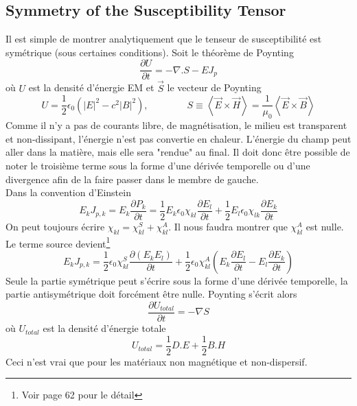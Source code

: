 \subsection{Symmetry of the Susceptibility Tensor}
Il est simple de montrer analytiquement que le tenseur de susceptibilité est symétrique (sous certaines conditions).
Soit le théorème de Poynting
\begin{equation}
\dfrac{\partial U}{\partial t} = -\nabla.S-EJ_p
\end{equation}
où $U$ est la densité d'énergie EM et $\vec{S}$ le vecteur de Poynting
\begin{equation}
U = \frac{1}{2}\epsilon_0\left(|E|^2-c^2|B|^2\right),\qquad\qquad
S \equiv \left\langle \vec{E}\times\vec{H}\right\rangle = \frac{1}{\mu_0}
\left\langle \vec{E}\times\vec{B}\right\rangle
\end{equation}
Comme il  n'y a pas de courants libre, de magnétisation, le milieu est transparent et non-dissipant, l'énergie
n'est pas convertie en chaleur. L'énergie du champ peut aller dans la matière, mais elle sera "rendue" au final.
Il doit donc être possible de noter le troisième terme sous la forme d'une dérivée temporelle ou d'une divergence
afin de la faire passer dans le membre de gauche.\\

Dans la convention d'Einstein
\begin{equation}
E_kJ_{p,k} = E_k\frac{\partial P_k}{\partial t} = \frac{1}{2}E_k\epsilon_0\chi_{kl}\frac{\partial E_l}{\partial t}+
\frac{1}{2}E_l\epsilon_0\chi_{lk}\frac{\partial E_k}{\partial t}
\end{equation}
On peut toujours écrire $\chi_{kl} = \chi_{kl}^S+\chi_{kl}^A$. Il nous faudra montrer que $\chi_{kl}^A$ est
nulle. Le terme source devient\footnote{Voir page 62 pour le détail}
\begin{equation}
E_kJ_{p,k} = \frac{1}{2}\epsilon_0\chi_{kl}^S\frac{\partial (E_kE_l)}{\partial t}+\frac{1}{2}
\epsilon_0\chi_{kl}^A\left(E_k\frac{\partial E_l}{\partial t}-E_l\frac{\partial E_k}{\partial t}\right)
\end{equation}
Seule la partie symétrique peut s'écrire sous la forme d'une dérivée temporelle, la partie antisymétrique doit
forcément être nulle. Poynting s'écrit alors
\begin{equation}
\dfrac{\partial U_{total}}{\partial t}= -\nabla S
\end{equation}
où $U_{total}$ est la densité d'énergie totale
\begin{equation}
U_{total} = \frac{1}{2}D.E+\frac{1}{2}B.H
\end{equation}
Ceci n'est vrai que pour les matériaux non magnétique et non-dispersif.



